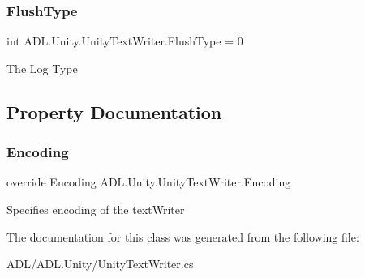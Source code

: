 \subsubsection{\texorpdfstring{Flush\+Type}{FlushType}}
{\footnotesize\ttfamily int A\+D\+L.\+Unity.\+Unity\+Text\+Writer.\+Flush\+Type = 0}



The Log Type 



\subsection{Property Documentation}
\mbox{\label{class_a_d_l_1_1_unity_1_1_unity_text_writer_ae188dacb6a045f6f314480f0fbd18ccc}} 
\subsubsection{\texorpdfstring{Encoding}{Encoding}}
{\footnotesize\ttfamily override Encoding A\+D\+L.\+Unity.\+Unity\+Text\+Writer.\+Encoding\hspace{0.3cm}{\ttfamily [get]}}



Specifies encoding of the text\+Writer 



The documentation for this class was generated from the following file\+:\begin{DoxyCompactItemize}
\item 
A\+D\+L/\+A\+D\+L.\+Unity/Unity\+Text\+Writer.\+cs\end{DoxyCompactItemize}
